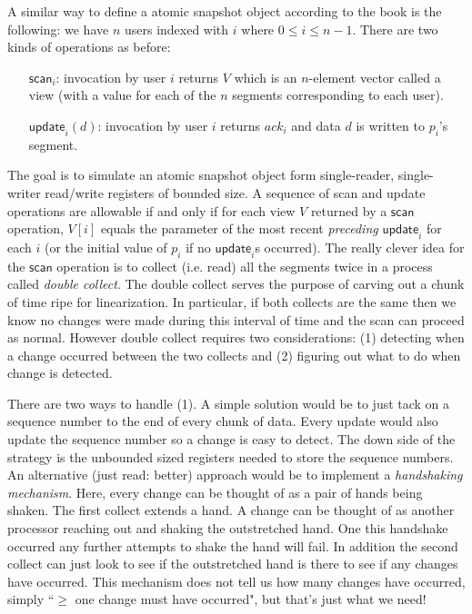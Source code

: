 \documentclass[twoside]{article}
\newcommand\updateF{\mathsf{update}}
\newcommand\scanF{\mathsf{scan}}
\begin{document}
A similar way to define a atomic snapshot object according to the book is the following: we have $n$ users indexed with $i$ where $0 \leq i \leq n-1$. There are two kinds of operations as before:
\begin{enumerate}
\item[$\scanF_i$:] invocation by user $i$ returns $V$ which is an $n$-element vector called a view (with a value for each of the $n$ segments corresponding to each user).
\item[$\updateF_i(d)$:] invocation by user $i$ returns $ack_i$ and data $d$ is written to $p_i$'s segment.
\end{enumerate}

The goal is to simulate an atomic snapshot object form single-reader, single-writer read/write registers of bounded size. A sequence of scan and update operations are allowable if and only if for each view $V$ returned by a $\scanF$ operation, $V[i]$ equals the parameter of the most recent \emph{preceding} $\updateF_i$ for each $i$ (or the initial value of $p_i$ if no $\updateF_i$s occurred). The really clever idea for the $\scanF$ operation is to collect (i.e. read) all the segments twice in a process called \emph{double collect}. The double collect serves the purpose of carving out a chunk of time ripe for linearization. In particular, if both collects are the same then we know no changes were made during this interval of time and the scan can proceed as normal. However double collect requires two considerations: (1) detecting when a change occurred between the two collects and (2) figuring out what to do when change is detected. 

There are two ways to handle (1). A simple solution would be to just tack on a sequence number to the end of every chunk of data. Every update would also update the sequence number so a change is easy to detect. The down side of the strategy is the unbounded sized registers needed to store the sequence numbers. An alternative (just read: better) approach would be to implement a \emph{handshaking mechanism}. Here, every change can be thought of as a pair of hands being shaken. The first collect extends a hand. A change can be thought of as another processor reaching out and shaking the outstretched hand. One this handshake occurred any further attempts to shake the hand will fail. In addition the second collect can just look to see if the outstretched hand is there to see if any changes have occurred. This mechanism does not tell us how many changes have occurred, simply ``$\geq$ one change must have occurred", but that's just what we need!
\end{document}
